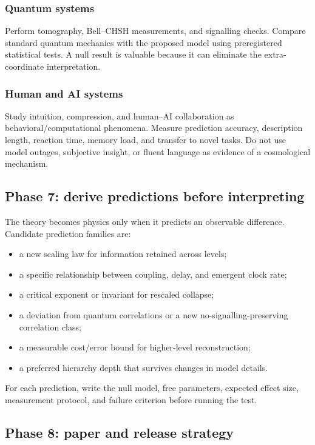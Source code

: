 \documentclass[11pt]{article}
\theoremstyle{definition}
\theoremstyle{plain}
\theoremstyle{remark}
\begin{document}
\subsubsection*{Quantum systems}

Perform tomography, Bell--CHSH measurements, and signalling checks. Compare standard quantum mechanics with the proposed model using preregistered statistical tests. A null result is valuable because it can eliminate the extra-coordinate interpretation.

\subsubsection*{Human and AI systems}

Study intuition, compression, and human--AI collaboration as behavioral/computational phenomena. Measure prediction accuracy, description length, reaction time, memory load, and transfer to novel tasks. Do not use model outages, subjective insight, or fluent language as evidence of a cosmological mechanism.

\subsection{Phase 7: derive predictions before interpreting}

The theory becomes physics only when it predicts an observable difference. Candidate prediction families are:
\begin{itemize}
  \item a new scaling law for information retained across levels;
  \item a specific relationship between coupling, delay, and emergent clock rate;
  \item a critical exponent or invariant for rescaled collapse;
  \item a deviation from quantum correlations or a new no-signalling-preserving correlation class;
  \item a measurable cost/error bound for higher-level reconstruction;
  \item a preferred hierarchy depth that survives changes in model details.
\end{itemize}

For each prediction, write the null model, free parameters, expected effect size, measurement protocol, and failure criterion before running the test.

\subsection{Phase 8: paper and release strategy}
\end{document}
